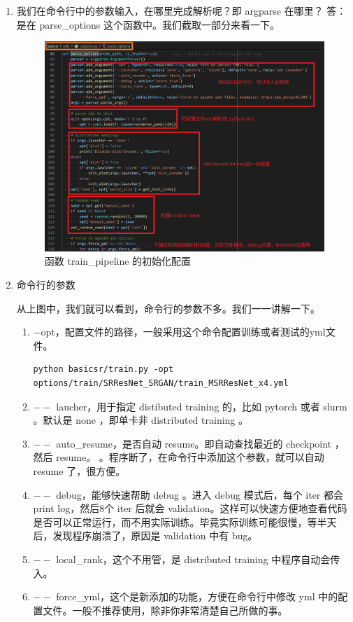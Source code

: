 \documentclass[../main.tex]{subfiles}
\begin{document}
\begin{enumerate}
    \item 我们在命令行中的参数输入，在哪里完成解析呢？即 argparse 在哪里？
    答：是在 parse\_options 这个函数中。我们截取一部分来看一下。

\begin{figure}[H]
\begin{center}
    \includegraphics[width=0.7\linewidth]{figures/getting_start_3.png}
    \caption{函数 train\_pipeline 的初始化配置}
    \label{fig:getting_start_1}
\end{center}
\vspace{-0.5cm}
\end{figure}

\item 命令行的参数
    
从上图中，我们就可以看到，命令行的参数不多。我们一一讲解一下。

\begin{enumerate}

\item $-$opt，配置文件的路径，一般采用这个命令配置训练或者测试的yml文件。

\begin{verbatim}
python basicsr/train.py -opt options/train/SRResNet_SRGAN/train_MSRResNet_x4.yml
\end{verbatim}

\item $--$ laucher，用于指定 distibuted training 的，比如 pytorch 或者 slurm 。默认是 none ，即单卡非 distributed training 。
\item $--$ auto\_resume，是否自动 resume。即自动查找最近的 checkpoint ，然后 resume。 。程序断了，在命令行中添加这个参数，就可以自动 resume 了，很方便。
\item $--$ debug，能够快速帮助 debug 。进入 debug 模式后，每个 iter 都会 print log，然后8个 iter 后就会 validation。这样可以快速方便地查看代码是否可以正常运行，而不用实际训练。毕竟实际训练可能很慢，等半天后，发现程序崩溃了，原因是 validation 中有 bug。
\item $--$ local\_rank，这个不用管，是 distributed training 中程序自动会传入。
\item $--$ force\_yml，这个是新添加的功能，方便在命令行中修改 yml 中的配置文件。一般不推荐使用，除非你非常清楚自己所做的事。


\end{enumerate}
\end{enumerate}
\end{document}
